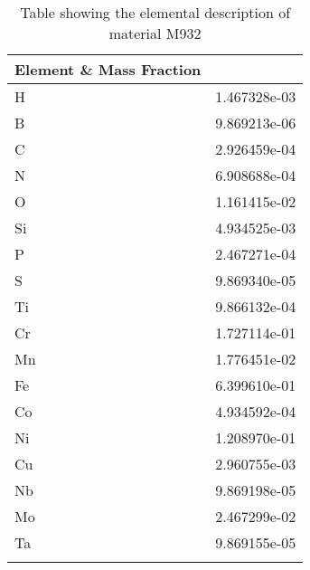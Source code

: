 \begin{centering}
\begin{longtable}[ht!]
\caption{Table showing the elemental description of material M921}
\label{table:material_EMH}
\end{longtable}
\clearpage

\begin{longtable}[ht!]
{ p{} | p{} }
\hline
Element \& Mass Fraction\\
\hline
H &  1.467328e-03\\
B &  9.869213e-06\\
C &  2.926459e-04\\
N &  6.908688e-04\\
O &  1.161415e-02\\
Si &  4.934525e-03\\
P &  2.467271e-04\\
S &  9.869340e-05\\
Ti &  9.866132e-04\\
Cr &  1.727114e-01\\
Mn &  1.776451e-02\\
Fe &  6.399610e-01\\
Co &  4.934592e-04\\
Ni &  1.208970e-01\\
Cu &  2.960755e-03\\
Nb &  9.869198e-05\\
Mo &  2.467299e-02\\
Ta &  9.869155e-05\\

\caption{Table showing the elemental description of material M932}
\label{table:material_UPDFW3}
\end{longtable}
\clearpage


\end{centering}
